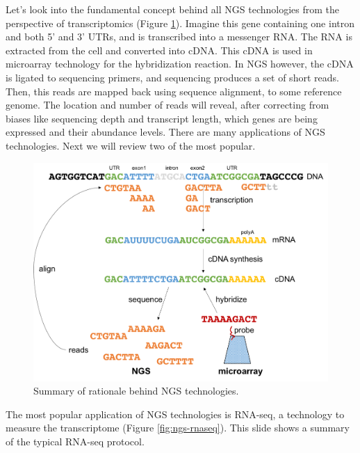 \documentclass[]{book}
\theoremstyle{definition}
\theoremstyle{definition}
\theoremstyle{definition}
\theoremstyle{remark}
\begin{document}
Let's look into the fundamental concept behind all NGS technologies from
the perspective of transcriptomics (Figure \ref{fig:ngs}). Imagine this
gene containing one intron and both 5' and 3' UTRs, and is transcribed
into a messenger RNA. The RNA is extracted from the cell and converted
into cDNA. This cDNA is used in microarray technology for the
hybridization reaction. In NGS however, the cDNA is ligated to
sequencing primers, and sequencing produces a set of short reads. Then,
this reads are mapped back using sequence alignment, to some reference
genome. The location and number of reads will reveal, after correcting
from biases like sequencing depth and transcript length, which genes are
being expressed and their abundance levels. There are many applications
of NGS technologies. Next we will review two of the most popular.

\begin{figure}
\includegraphics[width=19.79in]{pic/ngs} \caption{Summary of rationale behind NGS technologies.}\label{fig:ngs}
\end{figure}

The most popular application of NGS technologies is RNA-seq, a
technology to measure the transcriptome (Figure \ref{fig:ngs-rnaseq}).
This slide shows a summary of the typical RNA-seq protocol.
\end{document}
